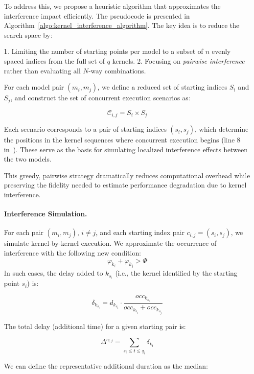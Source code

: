 To address this, we propose a heuristic algorithm that approximates the interference impact efficiently. The pseudocode is presented in Algorithm~\cref{algo:kernel_interference_algorithm}. The key idea is to reduce the search space by:

1. Limiting the number of starting points per model to a subset of $n$ evenly spaced indices from the full set of $q$ kernels.
2. Focusing on \textit{pairwise interference} rather than evaluating all $N$-way combinations.

For each model pair $(m_i, m_j)$, we define a reduced set of starting indices $S_i$ and $S_j$, and construct the set of concurrent execution scenarios as:

\begin{equation*}
	\mathcal{C}_{i,j} = S_i \times S_j
\end{equation*}

Each scenario corresponds to a pair of starting indices $(s_i, s_j)$, which determine the positions in the kernel sequences where concurrent execution begins (line 8 in~). These serve as the basis for simulating localized interference effects between the two models.

This greedy, pairwise strategy dramatically reduces computational overhead while preserving the fidelity needed to estimate performance degradation due to kernel interference.

\paragraph{Interference Simulation.} For each pair $(m_i, m_j)$, $i \neq j$, and each starting index pair $c_{i,j}=(s_i, s_j)$, we simulate kernel-by-kernel execution. We approximate the occurrence of interference with the following new condition:
\begin{equation}
	\varphi_{k_i} + \varphi_{k_j} > \Phi
\end{equation}
In such cases, the delay added to $k_{s_i}$ (i.e., the kernel identified by the starting point $s_i$) is:

$$
	\delta_{k_{s_i}} = d_{k_{s_i}} \cdot \frac{occ_{k_{s_i}}}{occ_{k_{s_i}} + occ_{k_{s_j}}}
$$

The total delay (additional time) for a given starting pair is:

$$
	\Delta^{c_{i,j}} = \sum_{ s_i \leq t \leq q_i} \delta_{k_t}
$$

We can define the representative additional duration as the median:


